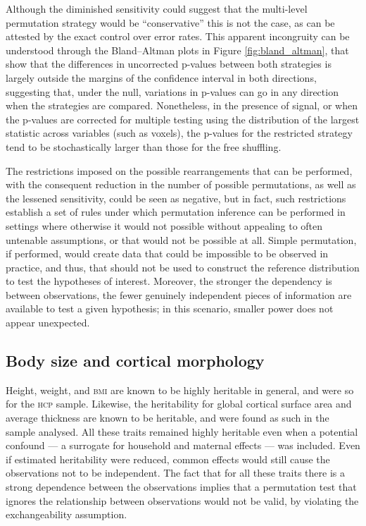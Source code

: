 Although the diminished sensitivity could suggest that the multi-level permutation strategy would be ``conservative'' this is not the case, as can be attested by the exact control over error rates. This apparent incongruity can be understood through the Bland--Altman plots in Figure \ref{fig:bland_altman}, that show that the differences in uncorrected p-values between both strategies is largely outside the margins of the confidence interval in both directions, suggesting that, under the null, variations in p-values can go in any direction when the strategies are compared. Nonetheless, in the presence of signal, or when the p-values are corrected for multiple testing using the distribution of the largest statistic across variables (such as voxels), the p-values for the restricted strategy tend to be stochastically larger than those for the free shuffling.

The restrictions imposed on the possible rearrangements that can be performed, with the consequent reduction in the number of possible permutations, as well as the lessened sensitivity, could be seen as negative, but in fact, such restrictions establish a set of rules under which permutation inference can be performed in settings where otherwise it would not possible without appealing to often untenable assumptions, or that would not be possible at all. Simple permutation, if performed, would create data that could be impossible to be observed in practice, and thus, that should not be used to construct the reference distribution to test the hypotheses of interest. Moreover, the stronger the dependency is between observations, the fewer genuinely independent pieces of information are available to test a given hypothesis; in this scenario, smaller power does not appear unexpected.

\subsection{Body size and cortical morphology}

Height, weight, and \textsc{bmi} are known to be highly heritable in general, and were so for the \textsc{hcp} sample. Likewise, the heritability for global cortical surface area and average thickness are known to be heritable, and were found as such in the sample analysed. All these traits remained highly heritable even when a potential confound --- a surrogate for household and maternal effects --- was included. Even if estimated heritability were reduced, common effects would still cause the observations not to be independent. The fact that for all these traits there is a strong dependence between the observations implies that a permutation test that ignores the relationship between observations would not be valid, by violating the exchangeability assumption.

